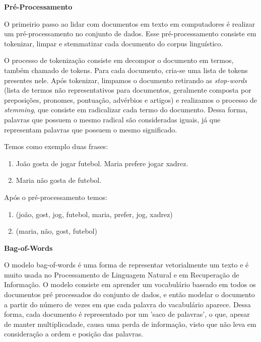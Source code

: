 \documentclass[a4paper,12pt]{article}
\begin{document}
\begin{description}
  \item \textbf{Pré-Processamento}
  
    O primeirio passo ao lidar com documentos em texto em computadores é realizar um pré-processamento no conjunto de dados. Esse 
    pré-processamento consiste em  tokenizar, limpar e stemmatizar cada documento do corpus linguístico. 
    
    O processo de tokenização consiste em decompor o documento em termos, também chamado de  tokens. Para cada documento, cria-se uma lista de 
    tokens presentes nele. Após tokenizar, limpamos o documento retirando  as \textit{stop-words} (lista de termos não representativos para
    documentos, geralmente composta por preposições, pronomes, pontuação, advérbios e artigos) e realizamos o processo de 
    \textit{stemming}, que consiste em radicalizar cada termo do documento. Dessa forma, palavras que possuem o mesmo radical são consideradas
    iguais, já que representam palavras que possuem o mesmo significado.
    
    Temos como exemplo duas frases:
    
    \begin{center}
      \begin{enumerate}
	\item João gosta de jogar futebol. Maria prefere jogar xadrez.
	\item Maria não gosta de futebol.
      \end{enumerate}
    \end{center}
    

    Após o pré-processamento temos:
    
    \begin{center}
      \begin{enumerate}
	\item (joão, gost, jog, futebol, maria, prefer, jog, xadrez)
	\item (maria, não, gost, futebol)
      \end{enumerate}
    \end{center}
    
    
  \item \textbf{Bag-of-Words}
  
   O modelo bag-of-words é uma forma de representar vetorialmente um texto e é muito usada no Processamento de Linguagem Natural e em
   Recuperação de Informação. O modelo consiste em aprender um vocabulário baseado em todos
   os documentos pré processados do conjunto de dados, e então modelar o documento a partir do número de vezes em que
   cada palavra do vacabulário aparece. Dessa forma, cada documento é representado por um 'saco de palavras', o que, apesar de manter
   multiplicadade, causa uma perda de informação, visto que não leva em consideração a ordem  e posição das palavras.
   

\end{description}
\end{document}

